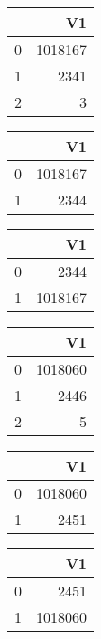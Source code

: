 \bigskip\bigskip
\centering
\begin{tabular}{rr}
  \hline
 & V1 \\ 
  \hline
0 & 1018167 \\ 
  1 & 2341 \\ 
  2 &   3 \\ 
   \hline
\end{tabular}

\bigskip\bigskip
\centering
\begin{tabular}{rr}
  \hline
 & V1 \\ 
  \hline
0 & 1018167 \\ 
  1 & 2344 \\ 
   \hline
\end{tabular}

\bigskip\bigskip
\centering
\begin{tabular}{rr}
  \hline
 & V1 \\ 
  \hline
0 & 2344 \\ 
  1 & 1018167 \\ 
   \hline
\end{tabular}

\bigskip\bigskip
\centering
\begin{tabular}{rr}
  \hline
 & V1 \\ 
  \hline
0 & 1018060 \\ 
  1 & 2446 \\ 
  2 &   5 \\ 
   \hline
\end{tabular}

\bigskip\bigskip
\centering
\begin{tabular}{rr}
  \hline
 & V1 \\ 
  \hline
0 & 1018060 \\ 
  1 & 2451 \\ 
   \hline
\end{tabular}

\bigskip\bigskip
\centering
\begin{tabular}{rr}
  \hline
 & V1 \\ 
  \hline
0 & 2451 \\ 
  1 & 1018060 \\ 
   \hline
\end{tabular}

